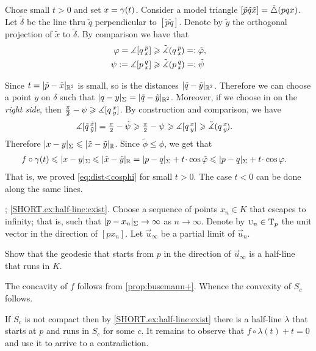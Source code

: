 Chose small $t>0$ and set $x\z=\gamma(t)$.
Consider a model triangle $[\tilde p\tilde q\tilde x]\z=\tilde\triangle(pqx)$.
Let $\tilde\delta$ be the line thru $\tilde q$ perpendicular to $[\tilde p\tilde q]$.
Denote by $\tilde y$ the orthogonal projection of $\tilde x$ to $\tilde\delta$.
By comparison we have that 
\begin{align*}
\varphi
=\measuredangle[q\,{}^{p}_{x}]
&\geqslant \tilde\measuredangle(q\,{}^{p}_{x}\hspace{-0.2ex})
\mathrel{=:}\tilde{\varphi},
\\
\psi:=
\measuredangle[p\,{}^{q}_{x}]
&\geqslant 
\tilde\measuredangle(p\,{}^{q}_{x}\hspace{-0.2ex})
\mathrel{=:}\tilde \psi
\end{align*}

Since $t=|\tilde p-\tilde x|_{\mathbb{R}^2}$ is small, so is the distances $|\tilde q-\tilde y|_{\mathbb{R}^2}$.
Therefore we can choose a point $y$ on $\delta$ such that $|q-y|_\Sigma=|\tilde q-\tilde y|_{\mathbb{R}^2}$.
Moreover, if we choose in on the \emph{right side}, then $\tfrac\pi2-\psi \geqslant \measuredangle[q\,{}^{x}_{y}]$.
By construction and comparison, we have 
\begin{align*}
\measuredangle[\tilde q\,{}^{\tilde x}_{\tilde y}]&=\tfrac\pi2-\tilde\psi
\geqslant
\tfrac\pi2-\psi
\geqslant
\measuredangle[q\,{}^{x}_{y}]
\geqslant 
\tilde\measuredangle(q\,{}^{x}_{y}\hspace{-0.2ex}).
\end{align*}
Therefore $|x-y|_\Sigma\leqslant |\tilde x-\tilde y|_{\mathbb{R}}$.
Since $\tilde\phi\le\phi$, we get that
\begin{align*}
f\circ\gamma(t)&\le |x-y|_\Sigma\le 
|\tilde x-\tilde y|_{\RR}=
|p-q|_\Sigma+t\cdot\cos\tilde\phi
\le
|p-q|_\Sigma+t\cdot\cos\phi.
\end{align*}
That is, we proved \ref{eq:dist<cosphi} for small $t>0$.
The case $t<0$ can be done along the same lines. 



\parbf{\ref{ex:half-line}}; \ref{SHORT.ex:half-line:exist}.
Choose a sequence of points $x_n\in K$ that escapes to infinity; that is, such that $\dist{p}{x_n}{\Sigma}\to\infty$ as $n\to\infty$.
Denote by $\text{\sc{u}}_n\in\mathrm{T}_p$ the unit vector in the direction of $[px_n]$.
Let $\vec u_\infty$ be a partial limit of $\vec u_n$.

Show that the geodesic that starts from $p$ in the direction of $\vec u_\infty$ is a half-line that runs in $K$.

 The concavity of $f$ follows from \ref{prop:busemann+}.
Whence the convexity of $S_c$ follows.

If $S_c$ is not compact then by \ref{SHORT.ex:half-line:exist} there is a half-line $\lambda$ that starts at $p$ and runs in $S_c$ for some $c$.
It remains to observe that $f\circ\lambda(t)+t=0$ and use it to arrive to a contradiction.

